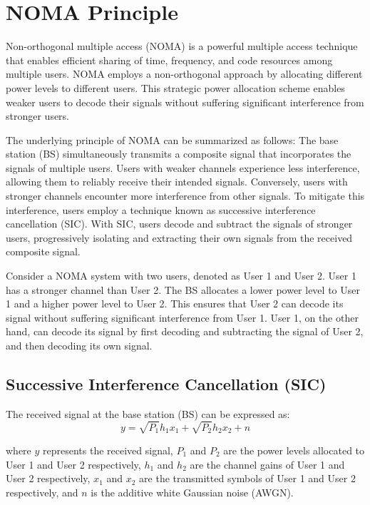 \documentclass[conference]{IEEEtran}
\begin{document}
\section{NOMA Principle}
Non-orthogonal multiple access (NOMA) \cite{saito2013non} is a powerful multiple access technique that enables efficient sharing of time, frequency, and code resources among multiple users. NOMA employs a non-orthogonal approach by allocating different power levels to different users. This strategic power allocation scheme enables weaker users to decode their signals without suffering significant interference from stronger users.

The underlying principle of NOMA can be summarized as follows: The base station (BS) simultaneously transmits a composite signal that incorporates the signals of multiple users. Users with weaker channels experience less interference, allowing them to reliably receive their intended signals. Conversely, users with stronger channels encounter more interference from other signals. To mitigate this interference, users employ a technique known as successive interference cancellation (SIC). With SIC, users decode and subtract the signals of stronger users, progressively isolating and extracting their own signals from the received composite signal.

Consider a NOMA system with two users, denoted as User 1 and User 2. User 1 has a stronger channel than User 2. The BS allocates a lower power level to User 1 and a higher power level to User 2. This ensures that User 2 can decode its signal without suffering significant interference from User 1. User 1, on the other hand, can decode its signal by first decoding and subtracting the signal of User 2, and then decoding its own signal.

\subsection{Successive Interference Cancellation (SIC)}

The received signal at the base station (BS) can be expressed as:
\begin{equation*}
    y = \sqrt{P_1} h_1 x_1 + \sqrt{P_2} h_2 x_2 + n
\end{equation*}

where $y$ represents the received signal, $P_1$ and $P_2$ are the power levels allocated to User 1 and User 2 respectively, $h_1$ and $h_2$ are the channel gains of User 1 and User 2 respectively, $x_1$ and $x_2$ are the transmitted symbols of User 1 and User 2 respectively, and $n$ is the additive white Gaussian noise (AWGN).
\end{document}
